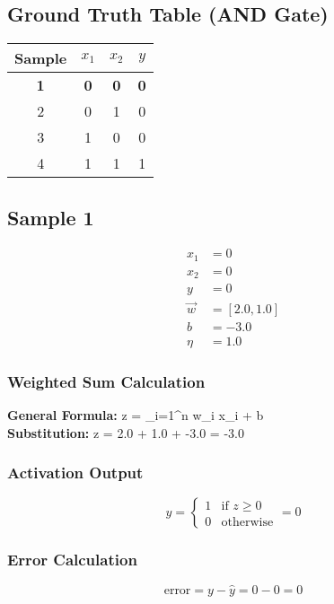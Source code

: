 \documentclass{article}
\begin{document}
\subsection*{Ground Truth Table (AND Gate)}
\begin{center}
\begin{tabular}{|c|c|c|c|}
\hline
\textbf{Sample} & $x_1$ & $x_2$ & $y$ \\
\hline
\rowcolor{yellow} \textbf{1} & \textbf{0} & \textbf{0} & \textbf{0} \\
\hline
2 & 0 & 1 & 0 \\
\hline
3 & 1 & 0 & 0 \\
\hline
4 & 1 & 1 & 1 \\
\hline
\end{tabular}
\end{center}

\subsection*{Sample 1}
\begin{align*}
x_1 &= 0 \\
x_2 &= 0 \\
y &= 0 \\
\vec{w} &= [2.0, 1.0] \\
b &= -3.0 \\
\eta &= 1.0
\end{align*}

\subsubsection*{Weighted Sum Calculation}
\textbf{General Formula:} \quad
z = \sum_{i=1}^{n} w_i x_i + b
\\
\textbf{Substitution:} \quad
z = 2.0  + 1.0  + -3.0 = -3.0

\subsubsection*{Activation Output}
\[
\hat{y} =
\begin{cases}
1 & \text{if } z \geq 0 \\
0 & \text{otherwise}
\end{cases}
= 0
\]

\subsubsection*{Error Calculation}
\[
\text{error} = y - \hat{y} = 0 - 0 = 0
\]
\end{document}
